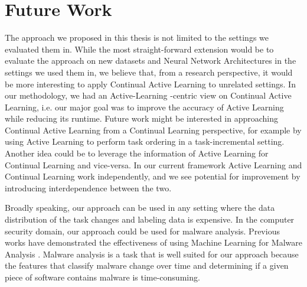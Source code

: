 \section{Future Work}
\label{sec:Conclusion:FutureWork}
The approach we proposed in this thesis is not limited to the settings we evaluated them in. While the most straight-forward extension would
be to evaluate the approach on new datasets and Neural Network Architectures in the settings we used them in, we believe that, from a research
perspective, it would be more interesting to apply Continual Active Learning to unrelated settings. In our methodology, we had an Active-Learning
-centric view on Continual Active Learning, i.e. our major goal was to improve the accuracy of Active Learning while reducing its runtime. Future
work might be interested in approaching Continual Active Learning from a Continual Learning perspective, for example by using Active Learning to
perform task ordering in a task-incremental setting. Another idea could be to leverage the information of Active Learning for Continual Learning
and vice-versa. In our current framework Active Learning and Continual Learning work independently, and we see potential for improvement by 
introducing interdependence between the two. \par
Broadly speaking, our approach can be used in any setting where the data distribution of the task changes and labeling data is expensive.
In the computer security domain, our approach could be used for malware analysis. Previous works have demonstrated the effectiveness of using
Machine Learning for Malware Analysis \cite{nath2014static} \cite{ijaz2019static}. Malware analysis is a task that is well suited for our approach
because the features that classify malware change over time and determining if a given piece of software contains malware is time-consuming. 
